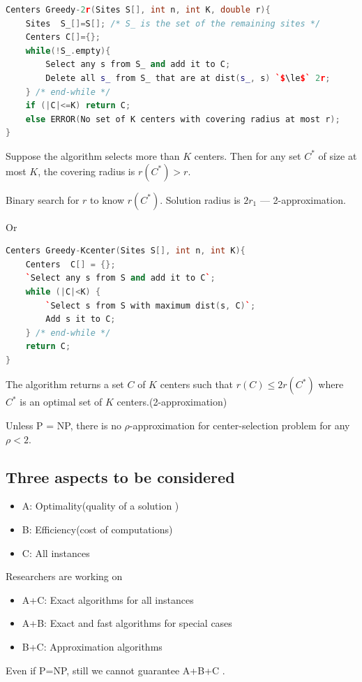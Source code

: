 \begin{lstlisting}[language={c++}]
Centers Greedy-2r(Sites S[], int n, int K, double r){
    Sites  S_[]=S[]; /* S_ is the set of the remaining sites */
    Centers C[]={};
    while(!S_.empty){
        Select any s from S_ and add it to C;
        Delete all s_ from S_ that are at dist(s_, s) `$\le$` 2r;
    } /* end-while */
    if (|C|<=K) return C;
    else ERROR(No set of K centers with covering radius at most r);
}
\end{lstlisting}
\begin{theorem}
    Suppose the algorithm selects more than $K$ centers.  Then for any set $C^*$ of size at most $K$, the covering radius is $r(C^*) > r$.
\end{theorem}


Binary search for $r$ to know $r(C^*)$. Solution radius is $2r_1$ --- 2-approximation. 

Or
\begin{lstlisting}[language={c++}]
Centers Greedy-Kcenter(Sites S[], int n, int K){
    Centers  C[] = {};
    `Select any s from S and add it to C`;
    while (|C|<K) {
        `Select s from S with maximum dist(s, C)`;
        Add s it to C;
    } /* end-while */
    return C;
}
\end{lstlisting}
\begin{theorem}
    The algorithm returns a set $C$ of $K$ centers such that $r(C) \le 2r(C^*)$ where $C^*$ is an optimal set of $K$ centers.(2-approximation)
\end{theorem}

\begin{theorem}
    Unless P = NP, there is no  $\rho$-approximation for center-selection problem for any $\rho < 2$.
\end{theorem}

\subsection{Three aspects to be considered}
\begin{itemize}
    \item A: Optimality(quality of a solution
    )
    \item B: Efficiency(cost of computations)
    \item C: All instances 
\end{itemize}

Researchers are working on
\begin{itemize}
    \item A+C: Exact algorithms for all instances
    \item A+B: Exact and fast algorithms for special cases
    \item B+C: Approximation algorithms 
\end{itemize}
Even if P=NP, still we cannot guarantee A+B+C .
